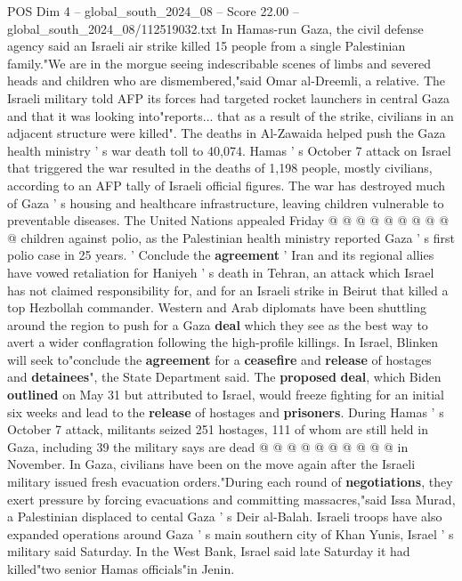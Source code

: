 \begin{textsample}{POS Dim 4 – global\_south\_2024\_08 – Score 22.00 – global\_south\_2024\_08/112519032.txt}
In Hamas-run Gaza, the civil defense agency said an Israeli air strike killed 15 people from a single Palestinian family."We are in the morgue seeing indescribable scenes of limbs and severed heads and children who are dismembered,"said Omar al-Dreemli, a relative.
The Israeli military told AFP its forces had targeted rocket launchers in central Gaza and that it was looking into"reports... that as a result of the strike, civilians in an adjacent structure were killed".
The deaths in Al-Zawaida helped push the Gaza health ministry ' s war death toll to 40,074.
Hamas ' s October 7 attack on Israel that triggered the war resulted in the deaths of 1,198 people, mostly civilians, according to an AFP tally of Israeli official figures.
The war has destroyed much of Gaza ' s housing and healthcare infrastructure, leaving children vulnerable to preventable diseases.
The United Nations appealed Friday @ @ @ @ @ @ @ @ @ @ children against polio, as the Palestinian health ministry reported Gaza ' s first polio case in 25 years. ' Conclude the \textbf{agreement} ' Iran and its regional allies have vowed retaliation for Haniyeh ' s death in Tehran, an attack which Israel has not claimed responsibility for, and for an Israeli strike in Beirut that killed a top Hezbollah commander.
Western and Arab diplomats have been shuttling around the region to push for a Gaza \textbf{deal} which they see as the best way to avert a wider conflagration following the high-profile killings.
In Israel, Blinken will seek to"conclude the \textbf{agreement} for a \textbf{ceasefire} and \textbf{release} of hostages and \textbf{detainees}", the State Department said.
The \textbf{proposed} \textbf{deal}, which Biden \textbf{outlined} on May 31 but attributed to Israel, would freeze fighting for an initial six weeks and lead to the \textbf{release} of hostages and \textbf{prisoners}.
During Hamas ' s October 7 attack, militants seized 251 hostages, 111 of whom are still held in Gaza, including 39 the military says are dead @ @ @ @ @ @ @ @ @ @ in November.
In Gaza, civilians have been on the move again after the Israeli military issued fresh evacuation orders."During each round of \textbf{negotiations}, they exert pressure by forcing evacuations and committing massacres,"said Issa Murad, a Palestinian displaced to cental Gaza ' s Deir al-Balah.
Israeli troops have also expanded operations around Gaza ' s main southern city of Khan Yunis, Israel ' s military said Saturday.
In the West Bank, Israel said late Saturday it had killed"two senior Hamas officials"in Jenin.

\end{textsample}
